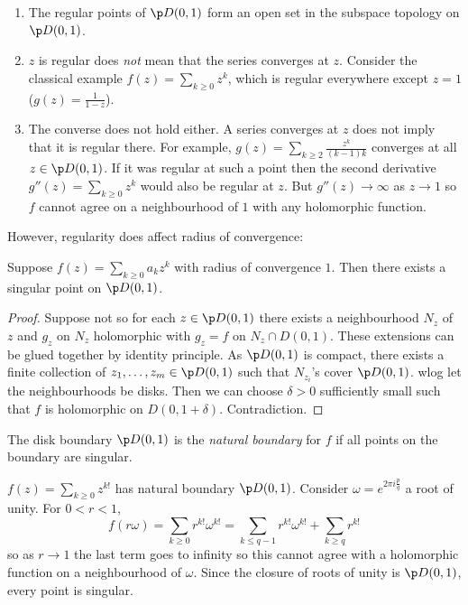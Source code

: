 \documentclass[a4paper]{article}
\begin{document}
\begin{remark}\leavevmode
  \begin{enumerate}
  \item The regular points of \(\p D(0, 1)\) form an open set in the subspace topology on \(\p D(0, 1)\).
  \item \(z\) is regular does \emph{not} mean that the series converges at \(z\). Consider the classical example \(f(z) = \sum_{k \geq 0} z^k\), which is regular everywhere except \(z = 1\) (\(g(z) = \frac{1}{1 - z}\)).
  \item The converse does not hold either. A series converges at \(z\) does not imply that it is regular there. For example, \(g(z) = \sum_{k \geq 2} \frac{z^k}{(k - 1)k}\) converges at all \(z \in \p D(0, 1)\). If it was regular at such a point then the second derivative \(g''(z) = \sum_{k \geq 0} z^k\) would also be regular at \(z\). But \(g''(z) \to \infty\) as \(z \to 1\) so \(f\) cannot agree on a neighbourhood of \(1\) with any holomorphic function.
  \end{enumerate}
\end{remark}

However, regularity does affect radius of convergence:
\begin{proposition}
  Suppose \(f(z) = \sum_{k \geq 0} a_kz^k\) with radius of convergence \(1\). Then there exists a singular point on \(\p D(0, 1)\).
\end{proposition}

\begin{proof}
  Suppose not so for each \(z \in \p D(0, 1)\) there exists a neighbourhood \(N_z\) of \(z\) and \(g_z\) on \(N_z\) holomorphic with \(g_z = f\) on \(N_z \cap D(0, 1)\). These extensions can be glued together by identity principle. As \(\p D(0, 1)\) is compact, there exists a finite collection of \(z_1, \dots, z_m \in \p D(0, 1)\) such that \(N_{z_i}\)'s cover \(\p D(0, 1)\). wlog let the neighbourhoods be disks. Then we can choose \(\delta > 0\) sufficiently small such that \(f\) is holomorphic on \(D(0, 1 + \delta)\). Contradiction.
\end{proof}

\begin{definition}
  The disk boundary \(\p D(0, 1)\) is the \emph{natural boundary} for \(f\) if all points on the boundary are singular.
\end{definition}

\begin{eg}
  \(f(z) = \sum_{k \geq 0} z^{k!}\) has natural boundary \(\p D(0, 1)\). Consider \(\omega = e^{2\pi i \frac{p}{q}}\) a root of unity. For \(0 < r < 1\),
  \[
    f(r \omega)
    = \sum_{k \geq 0} r^{k!} \omega^{k!}
    = \sum_{k \leq q - 1} r^{k!} \omega^{k!} + \sum_{k \geq q} r^{k!}
  \]
  so as \(r \to 1\) the last term goes to infinity so this cannot agree with a holomorphic function on a neighbourhood of \(\omega\). Since the closure of roots of unity is \(\p D(0, 1)\), every point is singular.
\end{eg}
\end{document}
